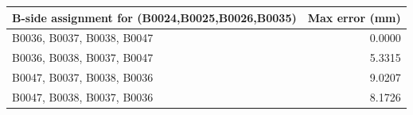 \begin{tabular}{@{}lr@{}}
\toprule
B-side assignment for (B0024,B0025,B0026,B0035) & Max error (mm)\\
\midrule
B0036, B0037, B0038, B0047 & 0.0000\\
B0036, B0038, B0037, B0047 & 5.3315\\
B0047, B0037, B0038, B0036 & 9.0207\\
B0047, B0038, B0037, B0036 & 8.1726\\
\bottomrule
\end{tabular}

